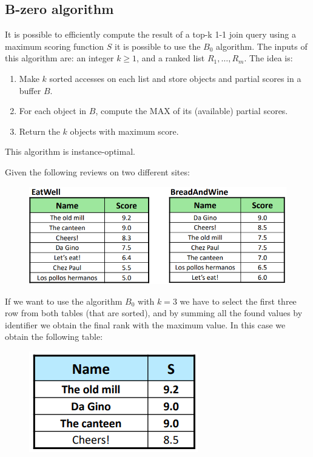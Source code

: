 \documentclass[12pt, a4paper]{report}
\newtheorem[style=M,bodystyle=\normalfont]{theorem}{Theorem}
\newtheorem[style=M,bodystyle=\normalfont]{corollary}{Corollary}
\newtheorem[style=M,bodystyle=\normalfont]{lemma}{Lemma}
\newtheorem[style=M,bodystyle=\normalfont]{definition}{Definition}
\begin{document}
    \subsection{B-zero algorithm}
    It is possible to efficiently compute the result of a top-k 1-1 join query using a maximum scoring function $S$ it is possible to use the $B_0$ algorithm. The inputs
    of this algorithm are: an integer $k \geq 1$, and a ranked list $R_1,\dots,R_m$. The idea is: 
    \begin{enumerate}
        \item Make $k$ sorted accesses on each list and store objects and partial scores in a buffer $B$. 
        \item For each object in $B$, compute the MAX of its (available) partial scores.
        \item Return the $k$ objects with maximum score.
    \end{enumerate}
    This algorithm is instance-optimal. 
    \begin{example}
        Given the following reviews on two different sites: 
        \begin{figure}[H]
            \centering
            \includegraphics[width=0.75\linewidth]{images/111query.png}
        \end{figure}
        If we want to use the algorithm $B_0$ with $k=3$ we have to select the first three row from both tables (that are sorted), and by summing all the found values by identifier we
        obtain the final rank with the maximum value. In this case we obtain the following table: 
        \begin{figure}[H]
            \centering
            \includegraphics[width=0.35\linewidth]{images/ex3.png}
        \end{figure}
    \end{example}
\end{document}
